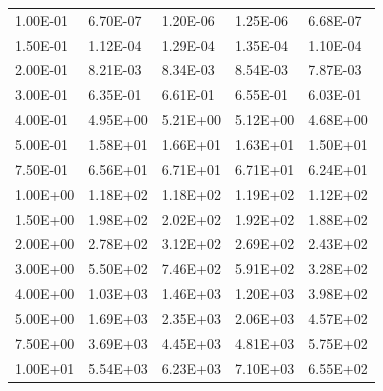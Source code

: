 \begin{table}[]
\begin{center}
\begin{threeparttable}
\begin{tabular}{@{}lllll@{}}
1.00E-01 & 6.70E-07          & 1.20E-06                  & 1.25E-06                & 6.68E-07                  \\
1.50E-01 & 1.12E-04          & 1.29E-04                  & 1.35E-04                & 1.10E-04                  \\
2.00E-01 & 8.21E-03          & 8.34E-03                  & 8.54E-03                & 7.87E-03                  \\
3.00E-01 & 6.35E-01          & 6.61E-01                  & 6.55E-01                & 6.03E-01                  \\
4.00E-01 & 4.95E+00          & 5.21E+00                  & 5.12E+00                & 4.68E+00                  \\
5.00E-01 & 1.58E+01          & 1.66E+01                  & 1.63E+01                & 1.50E+01                  \\
7.50E-01 & 6.56E+01          & 6.71E+01                  & 6.71E+01                & 6.24E+01                  \\
1.00E+00 & 1.18E+02          & 1.18E+02                  & 1.19E+02                & 1.12E+02                  \\
1.50E+00 & 1.98E+02          & 2.02E+02                  & 1.92E+02                & 1.88E+02                  \\
2.00E+00 & 2.78E+02          & 3.12E+02                  & 2.69E+02                & 2.43E+02                  \\
3.00E+00 & 5.50E+02          & 7.46E+02                  & 5.91E+02                & 3.28E+02                  \\
4.00E+00 & 1.03E+03          & 1.46E+03                  & 1.20E+03                & 3.98E+02                  \\
5.00E+00 & 1.69E+03          & 2.35E+03                  & 2.06E+03                & 4.57E+02                  \\
7.50E+00 & 3.69E+03          & 4.45E+03                  & 4.81E+03                & 5.75E+02                  \\
1.00E+01 & 5.54E+03          & 6.23E+03                  & 7.10E+03                & 6.55E+02                  \\ \bottomrule
\end{tabular}
\end{threeparttable}
\label{table: reaction_rates}
\end{center}
\end{table}


